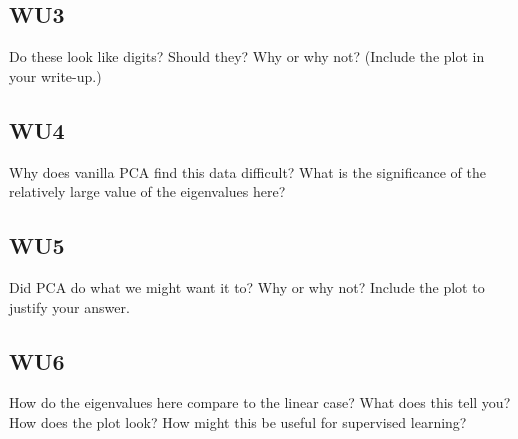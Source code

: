\documentclass[a4paper,11pt]{article}
\begin{document}
\subsection{WU3}
\textsf{Do these look like digits? Should they? Why or why not?
(Include the plot in your write-up.)}\vspace{0.1in}


\subsection{WU4}
\textsf{Why does vanilla PCA find this data difficult? What is the
significance of the relatively large value of the eigenvalues here?}\vspace{0.1in}

\subsection{WU5}
\textsf{Did PCA do what we might want it to? Why or why not? Include
the plot to justify your answer.}\vspace{0.1in}


\subsection{WU6}
\textsf{How do the eigenvalues here compare to the linear case? What
does this tell you? How does the plot look? How might this be useful
for supervised learning?}\vspace{0.1in}

\end{document}

